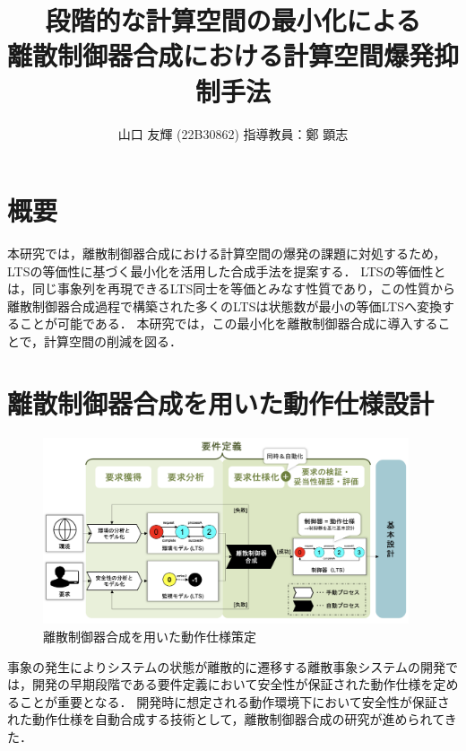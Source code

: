 \documentclass[11pt]{jarticle}
\begin{document}

\title{段階的な計算空間の最小化による\\離散制御器合成における計算空間爆発抑制手法}
\author{山口 友輝 (22B30862) \;\; 指導教員：鄭 顕志}
\date{\empty} %
\maketitle %
\thispagestyle{fancy}


\section{概要} 
本研究では，離散制御器合成における計算空間の爆発の課題に対処するため，LTSの等価性に基づく最小化を活用した合成手法を提案する．
LTSの等価性とは，同じ事象列を再現できるLTS同士を等価とみなす性質であり，この性質から離散制御器合成過程で構築された多くのLTSは状態数が最小の等価LTSへ変換することが可能である．
本研究では，この最小化を離散制御器合成に導入することで，計算空間の削減を図る．


\section{離散制御器合成を用いた動作仕様設計}

\begin{figure}
  \centering
  \includegraphics[width=10.8cm]{./figures/DCS.png}
  \caption{離散制御器合成を用いた動作仕様策定}
  \label{fig:1}
\end{figure}

事象の発生によりシステムの状態が離散的に遷移する離散事象システムの開発では，開発の早期段階である要件定義において安全性が保証された動作仕様を定めることが重要となる\cite{rebok}．
開発時に想定される動作環境下において安全性が保証された動作仕様を自動合成する技術として，離散制御器合成\cite{concurrency}の研究が進められてきた．
\end{document}
